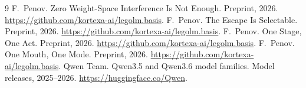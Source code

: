 \documentclass[11pt]{article}
\begin{document}
\begin{thebibliography}{9}
 F.~Penov. Zero Weight-Space Interference
Is Not Enough. Preprint, 2026. \url{https://github.com/kortexa-ai/legolm.basis}.
 F.~Penov. The Escape Is Selectable.
Preprint, 2026. \url{https://github.com/kortexa-ai/legolm.basis}.
 F.~Penov. One Stage, One Act. Preprint,
2026. \url{https://github.com/kortexa-ai/legolm.basis}.
 F.~Penov. One Mouth, One Mode. Preprint,
2026. \url{https://github.com/kortexa-ai/legolm.basis}.
 Qwen Team. Qwen3.5 and Qwen3.6 model families.
Model releases, 2025--2026. \url{https://huggingface.co/Qwen}.
\end{thebibliography}
\end{document}
